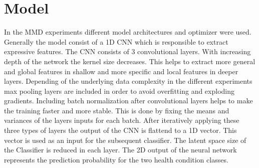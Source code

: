 \section{Model}
In the MMD experiments different model architectures and optimizer were used. Generally the model consist of a 1D CNN which is responsible to extract expressive features. The CNN consists of 3 convolutional layers. With increasing depth of the network the kernel size decreases. This helps to extract more general and global features in shallow and more specific and local features in deeper layers. Depending of the underlying data complexity in the different experiments max pooling layers are included in order to avoid overfitting and exploding gradients. Including batch normalization after convolutional layers helps to make the training faster and more stable. This is done by fixing the means and variances of the layers inputs for each batch. After iteratively applying these three types of layers the output of the CNN is flattend to a 1D vector. This vector is used as an input for the subsequent classifier. The latent space size of the Classifier is reduced in each layer. The 2D output of the neural network represents the prediction probability for the two health condition classes.

